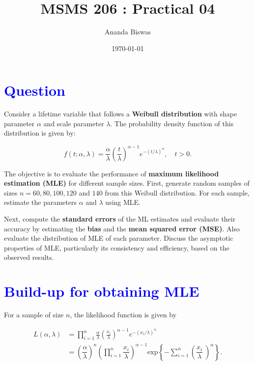 \documentclass[11pt, a4paper]{article}\usepackage[]{graphicx}\usepackage[]{xcolor}
\title{MSMS 206 : Practical 04}
\author{Ananda Biswas}
\date{\today}
\begin{document}
\maketitle


\section*{\faArrowAltCircleRight[regular] \textcolor{blue}{Question}}

\hspace{1cm} Consider a lifetime variable that follows a \textbf{Weibull distribution} with shape parameter $\alpha$ and scale parameter $\lambda$. The probability density function of this distribution is given by:

\[
f(t; \alpha, \lambda) = \frac{\alpha}{\lambda} \left( \frac{t}{\lambda} \right)^{\alpha - 1} e^{-(t/\lambda)^\alpha}, \quad t > 0.
\]

The objective is to evaluate the performance of \textbf{maximum likelihood estimation (MLE)} for different sample sizes. First, generate random samples of sizes $n = 60, 80, 100, 120$ and $140$ from this Weibull distribution. For each sample, estimate the parameters $\alpha$ and $\lambda$ using MLE.

Next, compute the \textbf{standard errors} of the ML estimates and evaluate their accuracy by estimating the \textbf{bias} and the \textbf{mean squared error (MSE)}. Also evaluate the distribution of MLE of each parameter. Discuss the asymptotic properties of MLE, particularly its consistency and efficiency, based on the observed results.




\section*{\faArrowAltCircleRight[regular] \textcolor{blue}{Build-up for obtaining MLE}}

For a sample of size $n$, the likelihood function is given by

\begin{align*}
L(\alpha, \lambda) &= \prod \limits_{i = 1}^{n} \frac{\alpha}{\lambda} \left( \frac{x_i}{\lambda} \right)^{\alpha - 1} e^{-(x_i / \lambda)^\alpha} \\
&= \left( \dfrac{\alpha}{\lambda} \right)^n \left( \prod \limits_{i = 1}^{n}  \dfrac{x_i}{\lambda} \right)^{\alpha - 1} \text{exp}\left\{- \sum \limits_{i = 1}^{n} \left( \dfrac{x_i}{\lambda}\ \right)^{\alpha} \right\}.
\end{align*}
\end{document}
